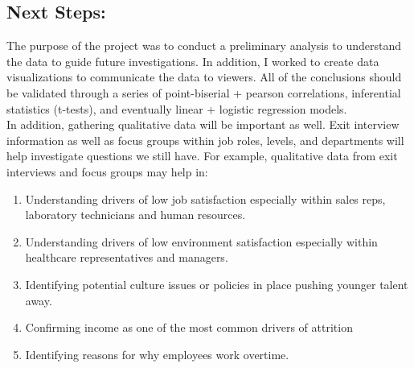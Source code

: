 \documentclass[
]{article}
\providecommand{\tightlist}{%
  \setlength{\itemsep}{0pt}\setlength{\parskip}{0pt}}
\begin{document}
\hypertarget{next-steps}{%
\subsection{Next Steps:}\label{next-steps}}

The purpose of the project was to conduct a preliminary analysis to
understand the data to guide future investigations. In addition, I
worked to create data visualizations to communicate the data to viewers.
All of the conclusions should be validated through a series of
point-biserial + pearson correlations, inferential statistics (t-tests),
and eventually linear + logistic regression models.\\
In addition, gathering qualitative data will be important as well. Exit
interview information as well as focus groups within job roles, levels,
and departments will help investigate questions we still have. For
example, qualitative data from exit interviews and focus groups may help
in:

\begin{enumerate}
\def\labelenumi{\arabic{enumi}.}
\tightlist
\item
  Understanding drivers of low job satisfaction especially within sales
  reps, laboratory technicians and human resources.
\item
  Understanding drivers of low environment satisfaction especially
  within healthcare representatives and managers.
\item
  Identifying potential culture issues or policies in place pushing
  younger talent away.
\item
  Confirming income as one of the most common drivers of attrition
\item
  Identifying reasons for why employees work overtime.
\end{enumerate}
\end{document}
